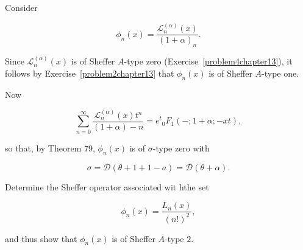 \begin{solution}
Consider

$$\phi_n(x) = \dfrac{\mathscr{L}_n^{(\alpha)}(x)}{(1+\alpha)_n}.$$

Since $\mathscr{L}_n^{(\alpha)}(x)$ is of Sheffer $A$-type zero (Exercise~\ref{problem4chapter13}), it follows by Exercise~\ref{problem2chapter13} that $\phi_n(x)$ is of Sheffer $A$-type one.

Now

$$\displaystyle\sum_{n=0}^{\infty} \dfrac{\mathscr{L}_n^{(\alpha)}(x) t^n}{(1+\alpha)-n} = e^t {}_0F_1(-;1+\alpha;-xt),$$

so that, by Theorem 79, $\phi_n(x)$ is of $\sigma$-type zero with

$$\sigma = \mathscr{D}(\theta + 1 + 1 -a) = \mathscr{D}(\theta + \alpha).$$
\end{solution}
\begin{problem}\label{problem7chapter13}
Determine the Sheffer operator associated wit hthe set

$$\phi_n(x) = \dfrac{L_n(x)}{(n!)^2},$$

and thus show that $\phi_n(x)$ is of Sheffer $A$-type $2$.
\end{problem}
